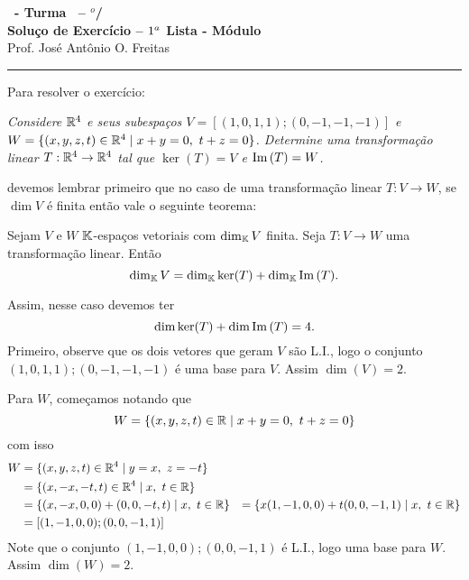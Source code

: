 \documentclass[12pt]{exam}
\begin{document}
    \begin{center}
        {\Large\bf \disciplina\ - Turma \turma\ -- \semestre$^{o}$/\ano} \\ \vspace{9pt} {\large\bf
            Solu\c{c}o de Exercício -- $1^a$ Lista - Módulo \numeromodulo}\\ \vspace{9pt} Prof. José Antônio O. Freitas
    \end{center}
    \hrule

    Para resolver o exercício:
    \begin{center}
        \begin{flushleft}
            \textit{Considere $\mathbb{R}^4$ e seus subespa\c{c}os $V = [(1,0,1,1);(0,-1,-1,-1)]$ e $W = \{(x,y,z,t) \in \mathbb{R}^4 \mid x + y = 0,\ t + z = 0\}$. Determine uma transforma\c{c}ão linear $T : \mathbb{R}^4 \to \mathbb{R}^4$ tal que $\ker(T) = V$ e ${\rm Im\,}(T) = W$.}
         \end{flushleft}
    \end{center}
    devemos lembrar primeiro que no caso de uma transforma\c{c}ão linear $T \colon V \to W$, se $\dim V$ é finita então vale o seguinte teorema:

    \begin{tcolorbox}[colback=green!30, colframe=green!80!blue, title=Teorema do Núcleo e da Imagem]
        Sejam $V$ e $W$ $\mathbb{K}$-espa\c{c}os vetoriais com $\dim_{\mathbb{K}}V$ finita. Seja $T : V \to W$ uma transforma\c{c}ão linear. Então
        \[
            \dim_{\mathbb{K}}V = \dim_{\mathbb{K}}\ker(T) + \dim_{\mathbb{K}}{\rm Im\,}(T).
        \]
    \end{tcolorbox}

    Assim, nesse caso devemos ter
    \[
        \dim\ker(T) + \dim{\rm Im\,}(T) = 4.
    \]
    Primeiro, observe que os dois vetores que geram $V$ são L.I., logo o conjunto ${(1, 0, 1, 1); (0,-1,-1,-1)}$ é uma base para $V$. Assim $\dim(V) = 2$.

    Para $W$, come\c{c}amos notando que
    \[
        W = \{(x, y, z, t) \in \mathbb{R} \mid x + y = 0,\ t + z = 0\}
    \]
    com isso
    \begin{align*}
        W &= \{(x, y, z, t) \in \mathbb{R}^4 \mid y = x,\ z = -t\} \\ &= \{(x, -x, -t, t) \in \mathbb{R}^4 \mid x,\ t \in \mathbb{R}\} \\ &= \{(x, -x, 0, 0) + (0, 0, -t, t) \mid x,\ t \in \mathbb{R}\} &= \{x(1, -1, 0, 0) + t(0, 0, -1, 1) \mid x,\ t \in \mathbb{R}\} \\ &= [(1, -1, 0, 0); (0, 0, -1, 1)]
    \end{align*}
    Note que o conjunto ${(1, -1, 0, 0); (0, 0, -1, 1)}$ é L.I., logo uma base para $W$. Assim $\dim(W) = 2$.
\end{document}
